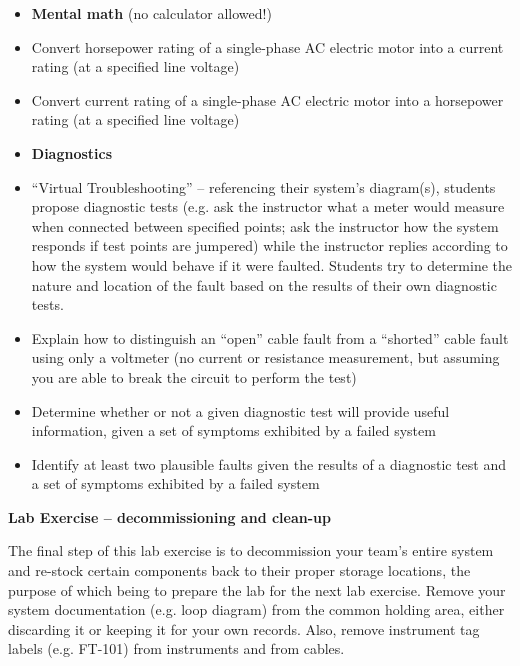 \filbreak

\begin{itemize}
\item{} {\bf Mental math} (no calculator allowed!)
\item{} Convert horsepower rating of a single-phase AC electric motor into a current rating (at a specified line voltage)
\item{} Convert current rating of a single-phase AC electric motor into a horsepower rating (at a specified line voltage)
\end{itemize}

\filbreak

\begin{itemize}
\item{} {\bf Diagnostics}
\item{} ``Virtual Troubleshooting'' -- referencing their system's diagram(s), students propose diagnostic tests (e.g. ask the instructor what a meter would measure when connected between specified points; ask the instructor how the system responds if test points are jumpered) while the instructor replies according to how the system would behave if it were faulted.  Students try to determine the nature and location of the fault based on the results of their own diagnostic tests.
\item{} Explain how to distinguish an ``open'' cable fault from a ``shorted'' cable fault using only a voltmeter (no current or resistance measurement, but assuming you are able to break the circuit to perform the test)
\item{} Determine whether or not a given diagnostic test will provide useful information, given a set of symptoms exhibited by a failed system
\item{} Identify at least two plausible faults given the results of a diagnostic test and a set of symptoms exhibited by a failed system
\end{itemize}


\vfil \eject

\noindent
{\bf Lab Exercise -- decommissioning and clean-up}

\vskip 5pt

The final step of this lab exercise is to decommission your team's entire system and re-stock certain components back to their proper storage locations, the purpose of which being to prepare the lab for the next lab exercise.  Remove your system documentation (e.g. loop diagram) from the common holding area, either discarding it or keeping it for your own records.  Also, remove instrument tag labels (e.g. FT-101) from instruments and from cables.

